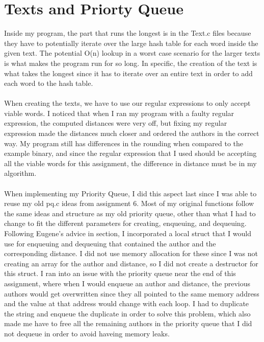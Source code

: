\documentclass[11pt]{article}
\begin{document}
\section{Texts and Priorty Queue}\label{ss:Texts}
Inside my program, the part that runs the longest is in the Text.c files because they have to potentially iterate over the large hash table for each word inside the given text. The potential O(n) lookup in a worst case scenario for the larger texts is what makes the program run for so long. In specific, the creation of the text is what takes the longest since it has to iterate over an entire text in order to add each word to the hash table. \\ \\
When creating the texts, we have to use our regular expressions to only accept viable words. I noticed that when I ran my program with a faulty regular expression, the computed distances were very off, but fixing my regular expression made the distances much closer and ordered the authors in the correct way. My program still has differences in the rounding when compared to the example binary, and since the regular expression that I used should be accepting all the viable words for this assignment, the difference in distance must be in my algorithm.
\\ \\
When implementing my Priority Queue, I did this aspect last since I was able to reuse my old pq.c ideas from assignment 6. Most of my original functions follow the same ideas and structure as my old priority queue, other than what I had to change to fit the different parameters for creating, enqueuing, and dequeuing. Following  Eugene's advice in section, I incorporated a local struct that I would use for enqueuing and dequeuing that contained the author and the corresponding distance. I did not use memory allocation for these since I was not creating an array for the author and distance, so I did not create a destructor for this struct. I ran into an issue with the priority queue near the end of this assignment, where when I would enqueue an author and distance, the previous authors would get overwritten since they all pointed to the same memory address and the value at that address would change with each loop. I had to duplicate the string and enqueue the duplicate in order to solve this problem, which also made me have to free all the remaining authors in the priority queue that I did not dequeue in order to avoid haveing memory leaks.
\\
\end{document}
